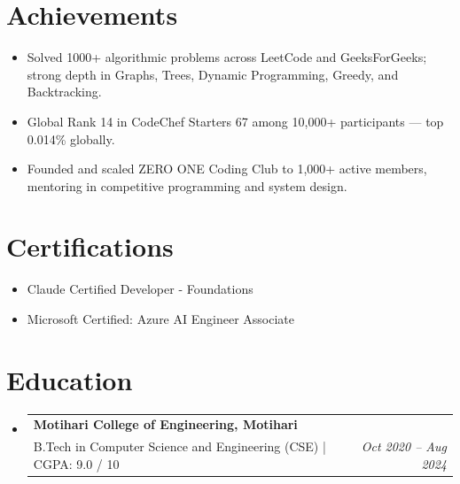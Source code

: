 \documentclass[11pt, letterpaper]{article}
\makeatletter
\newcommand{\resumeItem}[1]{
  \item\small{#1}
}
\newcommand{\resumeSubheading}[4]{
  \needspace{6cm}
  \vspace{-2pt}\item
    \begin{tabular*}{1.0\textwidth}[t]{@{}l@{\extracolsep{\fill}}r@{}}
      \textbf{\large #1} & \small #2 \\
      \small #3 & \textit{\small #4} \\
    \end{tabular*}\vspace{-7pt}
}
\newcommand{\resumeSubHeadingListStart}{\begin{itemize}[leftmargin=0.0in, label={}]}
\newcommand{\resumeSubHeadingListEnd}{\end{itemize}}
\newcommand{\resumeAchievementListStart}{\begin{itemize}[leftmargin=0.5cm, itemsep=-2pt]}
\newcommand{\resumeAchievementListEnd}{\end{itemize}\vspace{-2pt}}
\makeatother
\begin{document}
\section{Achievements}
\resumeAchievementListStart
  \resumeItem{Solved 1000+ algorithmic problems across LeetCode and GeeksForGeeks; strong depth in Graphs, Trees, Dynamic Programming, Greedy, and Backtracking.}
  \resumeItem{Global Rank 14 in CodeChef Starters 67 among 10,000+ participants — top 0.014\% globally.}
  \resumeItem{Founded and scaled ZERO ONE Coding Club to 1,000+ active members, mentoring in competitive programming and system design.}
\resumeAchievementListEnd


\section{Certifications}
\resumeAchievementListStart
  \resumeItem{Claude Certified Developer - Foundations}
  \resumeItem{Microsoft Certified: Azure AI Engineer Associate}
\resumeAchievementListEnd


\section{Education}
\resumeSubHeadingListStart
  \resumeSubheading{Motihari College of Engineering, Motihari}{}{B.Tech in Computer Science and Engineering (CSE) | CGPA: 9.0 / 10}{Oct 2020 -- Aug 2024}
\resumeSubHeadingListEnd
\end{document}
